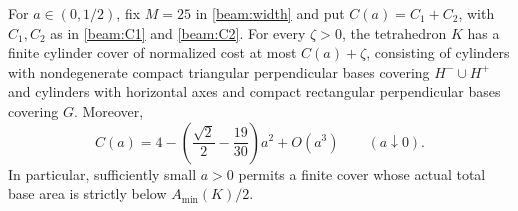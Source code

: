 \begin{proposition}
\label{beam:counterexample}
For $a\in(0,1/2)$, fix $M=25$ in \eqref{beam:width} and put
$C(a)=C_1+C_2$, with $C_1,C_2$ as in
\eqref{beam:C1} and \eqref{beam:C2}.
For every $\zeta>0$, the tetrahedron $K$ has a finite cylinder cover
of normalized cost at most $C(a)+\zeta$, consisting of cylinders with
nondegenerate compact triangular perpendicular bases covering
$H^-\cup H^+$ and cylinders with horizontal axes and compact
rectangular perpendicular bases covering $G$.
Moreover,
\begin{equation}\label{beam:strict-gain}
 C(a)=4-\left(\frac{\sqrt2}{2}-\frac{19}{30}\right)a^2+O(a^3)
 \qquad(a\downarrow0).
\end{equation}
In particular, sufficiently small $a>0$ permits a finite cover whose
actual total base area is strictly below $A_{\min}(K)/2$.
\end{proposition}
